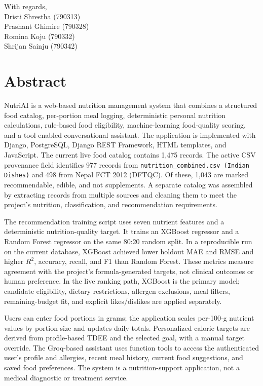 \documentclass[12pt,a4paper]{report}
\begin{document}
\vspace{1cm}
\noindent With regards,\\
Dristi Shrestha (790313)\\
Prashant Ghimire (790328)\\
Romina Koju (790332)\\
Shrijan Sainju (790342)

\chapter*{Abstract}
NutriAI is a web-based nutrition management system that combines a structured food
catalog, per-portion meal logging, deterministic personal nutrition calculations, rule-based
food eligibility, machine-learning food-quality scoring, and a tool-enabled conversational
assistant. The application is implemented with Django, PostgreSQL, Django REST
Framework, HTML templates, and JavaScript. The current live food catalog contains
1,475 records. The active CSV provenance field identifies 977 records from
\texttt{nutrition\_combined.csv (Indian Dishes)} and 498 from Nepal FCT 2012 (DFTQC).
Of these, 1,043 are marked recommendable, edible, and not supplements. A separate
catalog was assembled by extracting records from multiple sources and cleaning them to
meet the project's nutrition, classification, and recommendation requirements.

The recommendation training script uses seven nutrient features and a deterministic
nutrition-quality target. It trains an XGBoost regressor and a Random Forest regressor
on the same 80:20 random split. In a reproducible run on the current database, XGBoost
achieved lower holdout MAE and RMSE and higher $R^2$, accuracy, recall, and F1 than
Random Forest. These metrics measure agreement with the project's formula-generated
targets, not clinical outcomes or human preference. In the live ranking path, XGBoost is
the primary model; candidate eligibility, dietary restrictions, allergen exclusions, meal
filters, remaining-budget fit, and explicit likes/dislikes are applied separately.

Users can enter food portions in grams; the application scales per-100-g nutrient values
by portion size and updates daily totals. Personalized calorie targets are derived from
profile-based TDEE and the selected goal, with a manual target override. The Groq-based
assistant uses function tools to access the authenticated user's profile and allergies,
recent meal history, current food suggestions, and saved food preferences. The system
is a nutrition-support application, not a medical diagnostic or treatment service.
\end{document}
